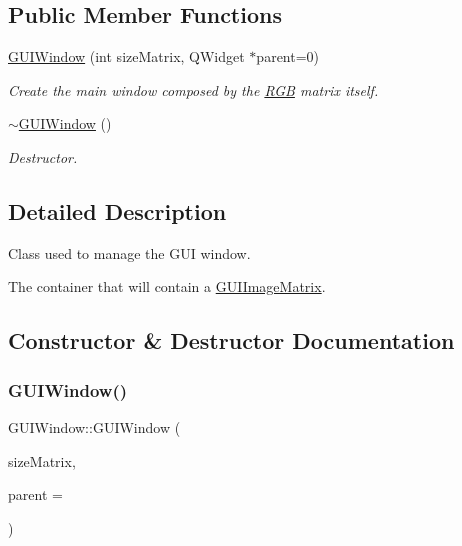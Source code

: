 \subsection*{Public Member Functions}
\begin{DoxyCompactItemize}
\item 
\mbox{\hyperlink{class_g_u_i_window_aebc2dd270ac7a36281c6f60f71c53c9e}{G\+U\+I\+Window}} (int size\+Matrix, Q\+Widget $\ast$parent=0)
\begin{DoxyCompactList}\small\item\em Create the main window composed by the \mbox{\hyperlink{class_r_g_b}{R\+GB}} matrix itself. \end{DoxyCompactList}\item 
\mbox{\hyperlink{class_g_u_i_window_a9c6d4277ffc74763b0a19fcdf15a5b7c}{$\sim$\+G\+U\+I\+Window}} ()
\begin{DoxyCompactList}\small\item\em Destructor. \end{DoxyCompactList}\end{DoxyCompactItemize}


\subsection{Detailed Description}
Class used to manage the G\+UI window. 

The container that will contain a \mbox{\hyperlink{class_g_u_i_image_matrix}{G\+U\+I\+Image\+Matrix}}. 

\subsection{Constructor \& Destructor Documentation}
\mbox{\label{class_g_u_i_window_aebc2dd270ac7a36281c6f60f71c53c9e}} 
\subsubsection{\texorpdfstring{G\+U\+I\+Window()}{GUIWindow()}}
{\footnotesize\ttfamily G\+U\+I\+Window\+::\+G\+U\+I\+Window (\begin{DoxyParamCaption}\item[{int}]{size\+Matrix,  }\item[{Q\+Widget $\ast$}]{parent = {} }\end{DoxyParamCaption})}



